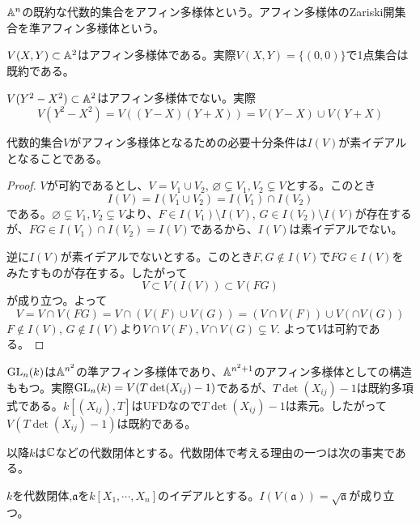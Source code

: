 \documentclass{ltjsreport}
\begin{document}
\begin{defin}
  $\mathbb{A}^n$の既約な代数的集合をアフィン多様体という。アフィン多様体のZariski開集合を準アフィン多様体という。
\end{defin}

\begin{eg}
  $V(X,Y)\subset\mathbb{A}^2$はアフィン多様体である。実際$V(X,Y)=\{(0,0)\}$で1点集合は既約である。
\end{eg}

\begin{eg}
  $V(Y^2-X^2)\subset \mathbb{A}^2$はアフィン多様体でない。実際
  \[
  V(Y^2-X^2)=V((Y-X)(Y+X))=V(Y-X)\cup V(Y+X)
  \]
\end{eg}

\begin{prop}\label{prime_affine}
  代数的集合$V$がアフィン多様体となるための必要十分条件は$I(V)$が素イデアルとなることである。
\end{prop}

\begin{proof}
  $V$が可約であるとし、$V=V_1\cup V_2$,  $\varnothing\subsetneq V_1,V_2\subsetneq V$とする。このとき
  \[
  I(V)=I(V_1\cup V_2)=I(V_1)\cap I(V_2)  
  \]
  である。$\varnothing\subsetneq V_1,V_2\subsetneq V$より、$F\in I(V_1)\setminus I(V)$, $G\in I(V_2)\setminus I(V)$が存在するが、$FG\in I(V_1)\cap I(V_2)=I(V)$であるから、$I(V)$は素イデアルでない。

  逆に$I(V)$が素イデアルでないとする。このとき$F, G\notin I(V)$で$FG\in I(V)$をみたすものが存在する。したがって
  \[
  V\subset V(I(V))\subset V(FG)
  \]
  が成り立つ。よって
  \[
  V=V\cap V(FG)=V\cap (V(F)\cup V(G))=(V\cap V(F))\cup V(\cap V(G))  
  \]
  $F\notin I(V)$, $G\notin I(V)$より$V\cap V(F), V\cap V(G)\subsetneq V$. よって$V$は可約である。
\end{proof}

\begin{eg}
  $\text{GL}_n(k)$は$\mathbb{A}^{n^2}$の準アフィン多様体であり、$\mathbb{A}^{n^2+1}$のアフィン多様体としての構造ももつ。実際$\text{GL}_n(k)=V(T\det(X_{ij})-1)$であるが、$T\det(X_{ij})-1$は既約多項式である。$k[(X_{ij}),T]$はUFDなので$T\det(X_{ij})-1$は素元。したがって$V(T\det(X_{ij})-1)$は既約である。
\end{eg}






以降$k$は$\mathbb{C}$などの代数閉体とする。代数閉体で考える理由の一つは次の事実である。

\begin{fact}\label{nullstellenzats}
  $k$を代数閉体,$\mathfrak{a}$を$k[X_1,\cdots,X_n]$のイデアルとする。$I(V(\mathfrak{a}))=\sqrt{\mathfrak{a}}$が成り立つ。
\end{fact}
\end{document}

